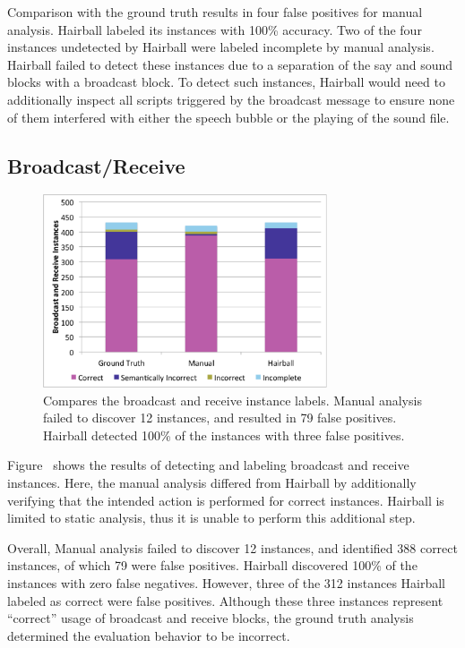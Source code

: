 Comparison with the ground truth results in four false positives for manual
analysis. Hairball labeled its instances with 100\% accuracy. Two of the four
instances undetected by Hairball were labeled incomplete by manual
analysis. Hairball failed to detect these instances due to a separation of the
say and sound blocks with a broadcast block. To detect such instances, Hairball
would need to additionally inspect all scripts triggered by the broadcast
message to ensure none of them interfered with either the speech bubble or the
playing of the sound file.

\subsection{Broadcast/Receive}
\begin{figure}[!t]
\centering \includegraphics[trim=.3in .15in .3in .15in, clip,
  width=3.3in]{graphs/AutoBroadcastReceive.eps}
\caption{Compares the broadcast and receive instance labels. Manual analysis
  failed to discover 12 instances, and resulted in 79 false positives. Hairball
  detected 100\% of the instances with three false positives.}
\end{figure}

Figure~ shows the results of detecting and
labeling broadcast and receive instances. Here, the manual analysis differed
from Hairball by additionally verifying that the intended action is performed
for correct instances. Hairball is limited to static analysis, thus it is
unable to perform this additional step.

Overall, Manual analysis failed to discover 12 instances, and identified 388
correct instances, of which 79 were false positives. Hairball discovered 100\%
of the instances with zero false negatives. However, three of the 312 instances
Hairball labeled as correct were false positives. Although these three
instances represent ``correct'' usage of broadcast and receive blocks, the
ground truth analysis determined the evaluation behavior to be incorrect.



